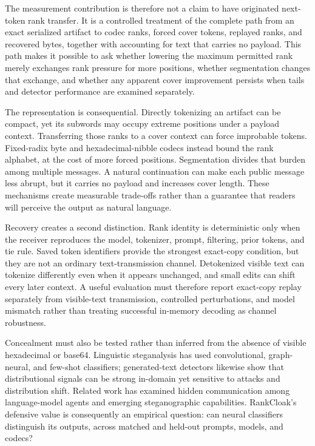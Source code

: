 \documentclass[fleqn,10pt]{wlscirep}
\begin{document}
The measurement contribution is therefore not a claim to have originated next-token rank transfer. It is a controlled treatment of the complete path from an exact serialized artifact to codec ranks, forced cover tokens, replayed ranks, and recovered bytes, together with accounting for text that carries no payload. This path makes it possible to ask whether lowering the maximum permitted rank merely exchanges rank pressure for more positions, whether segmentation changes that exchange, and whether any apparent cover improvement persists when tails and detector performance are examined separately.

The representation is consequential. Directly tokenizing an artifact can be compact, yet its subwords may occupy extreme positions under a payload context. Transferring those ranks to a cover context can force improbable tokens. Fixed-radix byte and hexadecimal-nibble codecs instead bound the rank alphabet, at the cost of more forced positions. Segmentation divides that burden among multiple messages. A natural continuation can make each public message less abrupt, but it carries no payload and increases cover length. These mechanisms create measurable trade-offs rather than a guarantee that readers will perceive the output as natural language.

Recovery creates a second distinction. Rank identity is deterministic only when the receiver reproduces the model, tokenizer, prompt, filtering, prior tokens, and tie rule. Saved token identifiers provide the strongest exact-copy condition, but they are not an ordinary text-transmission channel. Detokenized visible text can tokenize differently even when it appears unchanged, and small edits can shift every later context\cite{YanMurawaki2025TokenizationInconsistency}. A useful evaluation must therefore report exact-copy replay separately from visible-text transmission, controlled perturbations, and model mismatch rather than treating successful in-memory decoding as channel robustness.

Concealment must also be tested rather than inferred from the absence of visible hexadecimal or base64. Linguistic steganalysis has used convolutional, graph-neural, and few-shot classifiers\cite{Wen2019CNNTextSteganalysis,Wu2021GNNLinguisticSteganalysis,Wang2023FewShotLinguisticSteganalysis}; generated-text detectors likewise show that distributional signals can be strong in-domain yet sensitive to attacks and distribution shift\cite{Gehrmann2019GLTR,Mitchell2023DetectGPT,Sadasivan2025AIDetection}. Related work has examined hidden communication among language-model agents and emerging steganographic capabilities\cite{Motwani2024SecretCollusion,Zolkowski2026EarlySigns}. RankCloak's defensive value is consequently an empirical question: can neural classifiers distinguish its outputs, across matched and held-out prompts, models, and codecs?
\end{document}
